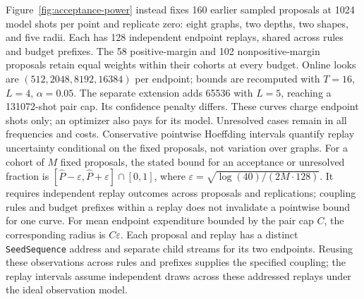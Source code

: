 \documentclass[11pt]{article}
\begin{document}
Figure~\ref{fig:acceptance-power} instead fixes 160 earlier sampled
proposals at 1024 model shots per point and replicate zero: eight graphs,
two depths, two shapes, and five radii. Each has 128 independent endpoint
replays, shared across rules and budget prefixes. The 58 positive-margin
and 102 nonpositive-margin proposals retain equal weights within their
cohorts at every budget. Online looks are $(512,2048,8192,16384)$ per
endpoint; bounds are recomputed with $T=16$, $L=4$, $\alpha=0.05$.
The separate extension adds 65536 with $L=5$, reaching a 131072-shot pair
cap. Its confidence penalty differs. These curves charge endpoint shots
only; an optimizer also pays for its model. Unresolved cases remain in
all frequencies and costs. Conservative pointwise Hoeffding intervals
quantify replay uncertainty conditional on the fixed proposals, not
variation over graphs. For a cohort of $M$ fixed proposals, the stated
bound for an acceptance or unresolved fraction is
$[\widehat P-\varepsilon,\widehat P+\varepsilon]\cap[0,1]$,
where $\varepsilon=\sqrt{\log(40)/(2M\cdot128)}$.
It requires independent replay outcomes across proposals and replications;
coupling rules and budget prefixes within a replay does not invalidate a
pointwise bound for one curve. For mean endpoint expenditure bounded by
the pair cap $C$, the corresponding radius is $C\varepsilon$.
Each proposal and replay has a distinct \texttt{SeedSequence} address and
separate child streams for its two endpoints. Reusing these observations
across rules and prefixes supplies the specified coupling; the replay
intervals assume independent draws across these addressed replays under
the ideal observation model.
\end{document}
